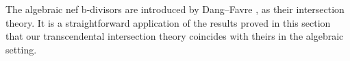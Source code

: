 \begin{remark}\label{rmk:bdiv:L749}
The algebraic nef b-divisors are introduced by Dang--Favre \cite{DF20}, as their intersection theory. It is a straightforward application of the results proved in this section that our transcendental intersection theory coincides with theirs in the algebraic setting.
\end{remark}
